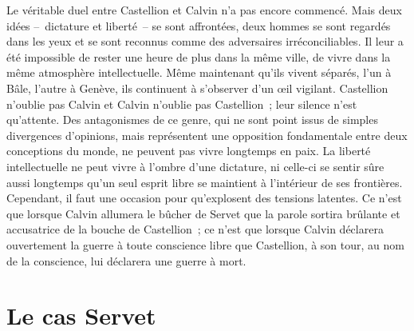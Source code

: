 \documentclass[french,twoside]{book} %
\newcommand{\astermono}{\medskip\centerline{\color{rubric}\large\selectfont{\syms ✻}}\medskip\par}%
\newcommand\chapteropen{} %
\newcommand\chapterclose{} %
\begin{document}
\astermono

\noindent Le véritable duel entre Castellion et Calvin n’a pas encore commencé. Mais deux idées – dictature et liberté – se sont affrontées, deux hommes se sont regardés dans les yeux et se sont reconnus comme des adversaires irréconciliables. Il leur a été impossible de rester une heure de plus dans la même ville, de vivre dans la même atmosphère intellectuelle. Même maintenant qu’ils vivent séparés, l’un à Bâle, l’autre à Genève, ils continuent à s’observer d’un œil vigilant. Castellion n’oublie pas Calvin et Calvin n’oublie pas Castellion ; leur silence n’est qu’attente. Des antagonismes de ce genre, qui ne sont point issus de simples divergences d’opinions, mais représentent une opposition fondamentale entre deux conceptions du monde, ne peuvent pas vivre longtemps en paix. La liberté intellectuelle ne peut vivre à l’ombre d’une dictature, ni celle-ci se sentir sûre aussi longtemps qu’un seul esprit libre se maintient à l’intérieur de ses frontières. Cependant, il faut une occasion pour qu’explosent des tensions latentes. Ce n’est que lorsque Calvin allumera le bûcher de Servet que la parole sortira brûlante et accusatrice de la bouche de Castellion ; ce n’est que lorsque Calvin déclarera ouvertement la guerre à toute conscience libre que Castellion, à son tour, au nom de la conscience, lui déclarera une guerre à mort.
\chapterclose


\chapteropen

\chapter[{Le cas Servet}]{Le cas Servet}
\renewcommand{\leftmark}{Le cas Servet}
\end{document}

